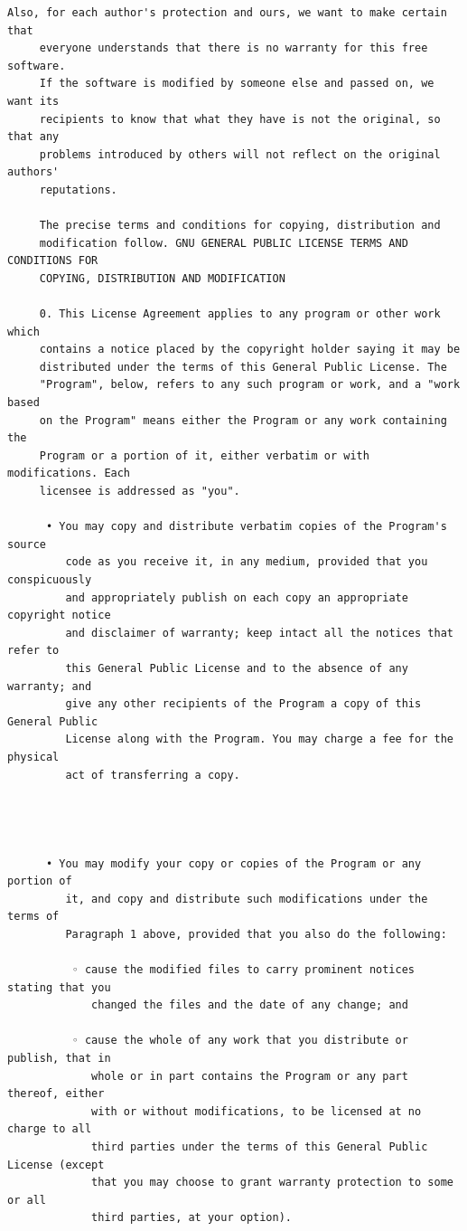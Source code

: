 \begin{lstlisting}[basicstyle=\ttfamily\footnotesize,breaklines=true]
     Also, for each author's protection and ours, we want to make certain that
     everyone understands that there is no warranty for this free software.
     If the software is modified by someone else and passed on, we want its
     recipients to know that what they have is not the original, so that any
     problems introduced by others will not reflect on the original authors'
     reputations.

     The precise terms and conditions for copying, distribution and
     modification follow. GNU GENERAL PUBLIC LICENSE TERMS AND CONDITIONS FOR
     COPYING, DISTRIBUTION AND MODIFICATION

     0. This License Agreement applies to any program or other work which
     contains a notice placed by the copyright holder saying it may be
     distributed under the terms of this General Public License. The
     "Program", below, refers to any such program or work, and a "work based
     on the Program" means either the Program or any work containing the
     Program or a portion of it, either verbatim or with modifications. Each
     licensee is addressed as "you".

      • You may copy and distribute verbatim copies of the Program's source
         code as you receive it, in any medium, provided that you conspicuously
         and appropriately publish on each copy an appropriate copyright notice
         and disclaimer of warranty; keep intact all the notices that refer to
         this General Public License and to the absence of any warranty; and
         give any other recipients of the Program a copy of this General Public
         License along with the Program. You may charge a fee for the physical
         act of transferring a copy.




      • You may modify your copy or copies of the Program or any portion of
         it, and copy and distribute such modifications under the terms of
         Paragraph 1 above, provided that you also do the following:

          ◦ cause the modified files to carry prominent notices stating that you
             changed the files and the date of any change; and

          ◦ cause the whole of any work that you distribute or publish, that in
             whole or in part contains the Program or any part thereof, either
             with or without modifications, to be licensed at no charge to all
             third parties under the terms of this General Public License (except
             that you may choose to grant warranty protection to some or all
             third parties, at your option).


\end{lstlisting}
